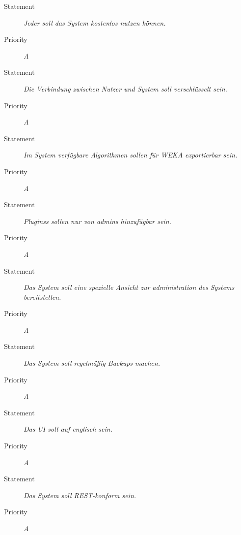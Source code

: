 \UR
\begin{description}
\item[Statement] \textit{Jeder soll das System kostenlos nutzen können.}
\item[Priority] \textit{A}
\end{description}


\UR
\begin{description}
\item[Statement] \textit{Die Verbindung zwischen Nutzer und System soll verschlüsselt sein.}
\item[Priority] \textit{A}
\end{description}


\UR
\begin{description}
\item[Statement] \textit{Im System verfügbare Algorithmen sollen für WEKA exportierbar sein.}
\item[Priority] \textit{A}
\end{description}


\UR
\begin{description}
\item[Statement] \textit{\glspl{Plugins} sollen nur von \glspl{admin} hinzufügbar sein.}
\item[Priority] \textit{A}
\end{description}


\UR
\begin{description}
\item[Statement] \textit{Das System soll eine spezielle Ansicht zur administration des Systems bereitstellen.}
\item[Priority] \textit{A}
\end{description}


\UR
\begin{description}
\item[Statement] \textit{Das System soll regelmäßig \glspl{Backup} machen.}%
\item[Priority] \textit{A}
\end{description}


\UR
\begin{description}
\item[Statement] \textit{Das \gls{UI} soll auf englisch sein.}
\item[Priority] \textit{A}
\end{description}


\UR
\begin{description}
\item[Statement] \textit{Das System soll \gls{REST}-konform sein.}
\item[Priority] \textit{A}
\end{description}


